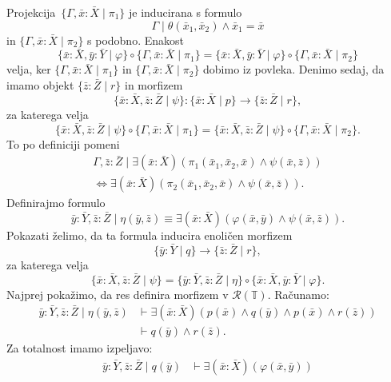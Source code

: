 \documentclass[../kategoricna_logika.tex]{subfiles}
\begin{document}
\begin{dokaz}
\begin{enumerate}[label=(\roman*)]
    Projekcija~$\{\Gamma ,\bar{x}:\bar{X} \mid \pi_1\}$ je inducirana s formulo
    \[\Gamma \mid \theta(\bar{x}_1,\bar{x}_2) \land \bar{x}_1 = \bar{x} \]
    in $\{\Gamma,\bar{x}:\bar{X} \mid \pi_2\}$ s podobno.  Enakost
    $$\{\bar{x}:\bar{X},\bar{y}:\bar{Y} \mid \varphi \} \circ \{\Gamma ,\bar{x}:\bar{X} \mid \pi_1\} =
    \{\bar{x}:\bar{X},\bar{y}:\bar{Y} \mid \varphi \} \circ \{\Gamma ,\bar{x}:\bar{X} \mid \pi_2\}$$
    velja, ker $\{\Gamma ,\bar{x}:\bar{X} \mid \pi_1\}$ in $\{\Gamma ,\bar{x}:\bar{X} \mid \pi_2\}$
    dobimo iz povleka. Denimo
    sedaj, da imamo objekt $\{\bar{z}:\bar{Z} \mid r\}$ in morfizem
    $$\{\bar{x}:\bar{X},\bar{z}:\bar{Z} \mid \psi\} : \{\bar{x}:\bar{X} \mid p\} \to \{\bar{z}:\bar{Z} \mid r\},$$
    za katerega velja
    \[\{\bar{x}:\bar{X},\bar{z}:\bar{Z} \mid \psi\} \circ \{\Gamma ,\bar{x}:\bar{X} \mid \pi_1\} =
      \{\bar{x}:\bar{X},\bar{z}:\bar{Z} \mid \psi\} \circ \{\Gamma ,\bar{x}:\bar{X} \mid \pi_2\}.\]
    To po definiciji pomeni
\begin{multline*}
    \Gamma,\bar{z}:\bar{Z} \mid \exists (\bar{x}:\bar{X} ) (\pi_1(\bar{x}_1,\bar{x}_2,\bar{x}) \land
      \psi(\bar{x},\bar{z})) \\
      \iff \exists (\bar{x}:\bar{X} ) (\pi_2(\bar{x}_1,\bar{x}_2,\bar{x}) \land
        \psi(\bar{x},\bar{z})).
   \end{multline*}
    Definirajmo formulo
    \[ \bar{y}:\bar{Y},\bar{z}:\bar{Z} \mid \eta(\bar{y},\bar{z}) \equiv
      \exists (\bar{x}:\bar{X} )(\varphi(\bar{x},\bar{y}) \land \psi(\bar{x},\bar{z})).\]
    Pokazati želimo, da ta formula inducira enoličen morfizem
    $${\{\bar{y}:\bar{Y} \mid q\} \to \{\bar{z}:\bar{Z} \mid r\}},$$
    za katerega velja
    $$\{\bar{x}:\bar{X},\bar{z}:\bar{Z} \mid \psi\} = \{\bar{y}:\bar{Y},\bar{z}:\bar{Z} \mid \eta\} \circ
    \{\bar{x}:\bar{X},\bar{y}:\bar{Y} \mid \varphi \}.$$
    Najprej pokažimo, da
    res definira morfizem v $\mathcal{R}(\mathbb{T})$. Računamo:
    \begin{align*}
      \bar{y}:\bar{Y},\bar{z}:\bar{Z} \mid \eta(\bar{y},\bar{z}) &\vdash \exists (\bar{x}:\bar{X} )(p(\bar{x}) \land q(\bar{y}) \land p(\bar{x}) \land r(\bar{z})) \\
                &\vdash q(\bar{y}) \land r(\bar{z}).
    \end{align*}
    Za totalnost imamo izpeljavo:
    \begin{align*}
      \bar{y}:\bar{Y},\bar{z}:\bar{Z} \mid  q(\bar{y}) &\vdash\exists (\bar{x}:\bar{X} )(\varphi(\bar{x},\bar{y})) \\

\end{align*}
\end{enumerate}
\end{dokaz}
\end{document}
